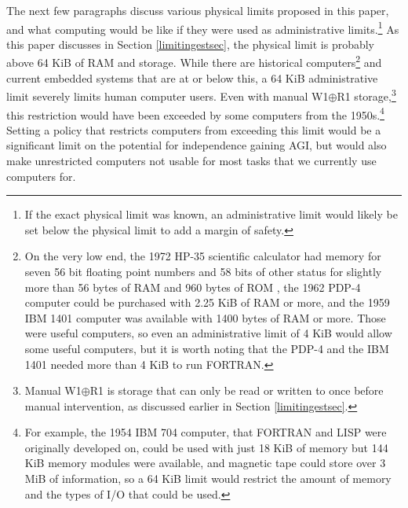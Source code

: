 \documentclass[letterpaper,twocolumn]{article}
\begin{document}



The next few paragraphs discuss various physical limits proposed in
this paper, and what computing would be like if they were used as
administrative limits.\footnote{If the exact physical limit was known,
an administrative limit would likely be set below the physical limit
to add a margin of safety.}  As this paper discusses in Section
\ref{limitingestsec}, the physical limit is probably above 64 KiB of
RAM and storage.  While there are historical computers\footnote{On the
very low end, the 1972 HP-35 scientific calculator had memory for seven 56
bit floating point numbers and 58 bits of other status for slightly
more than 56 bytes of RAM and 960 bytes of ROM
\citep{intro_to_comp_architecture}, the 1962 PDP-4 computer could be
purchased with 2.25 KiB of RAM or more, and the 1959 IBM 1401 computer
was available with 1400 bytes of RAM or more. Those were useful
computers, so even an administrative limit of 4 KiB would allow some
useful computers, but it is worth noting that the PDP-4 and the IBM
1401 needed more than 4 KiB to run FORTRAN.}  and current embedded
systems that are at or below this, a 64 KiB administrative limit
severely limits human computer users. Even with manual W1$\oplus$R1
storage,\footnote{Manual W1$\oplus$R1 is storage that can only be read
or written to once before manual intervention, as discussed earlier in
Section \ref{limitingestsec}.}  this restriction would have been
exceeded by some computers from the 1950s.\footnote{For example, the
1954 IBM 704 computer, that FORTRAN and LISP were originally developed
on, could be used with just 18 KiB of memory but 144 KiB memory
modules were available, and magnetic tape could store over 3 MiB of
information, so a 64 KiB limit would restrict the amount of memory and
the types of I/O that could be used.}  Setting a policy that restricts
computers from exceeding this limit would be a significant limit on
the potential for independence gaining AGI, but would also make
unrestricted computers not usable for most tasks that we currently use
computers for.
\end{document}
